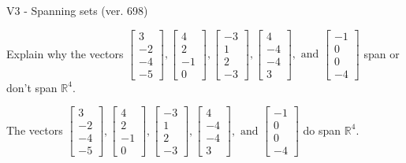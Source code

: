 \begin{exercise}
  \begin{exerciseTitle}V3 - Spanning sets (ver. 698)\end{exerciseTitle}
  \begin{exerciseStatement}
    Explain why the vectors \(\left[\begin{array}{r}
3 \\
-2 \\
-4 \\
-5
\end{array}\right] , \left[\begin{array}{r}
4 \\
2 \\
-1 \\
0
\end{array}\right] , \left[\begin{array}{r}
-3 \\
1 \\
2 \\
-3
\end{array}\right] , \left[\begin{array}{r}
4 \\
-4 \\
-4 \\
3
\end{array}\right] , \text{ and } \left[\begin{array}{r}
-1 \\
0 \\
0 \\
-4
\end{array}\right]\) span or don't span \(\mathbb{R}^4\). 
	


  \end{exerciseStatement}
  \begin{exerciseAnswer}
   The vectors \(\left[\begin{array}{r}
3 \\
-2 \\
-4 \\
-5
\end{array}\right] , \left[\begin{array}{r}
4 \\
2 \\
-1 \\
0
\end{array}\right] , \left[\begin{array}{r}
-3 \\
1 \\
2 \\
-3
\end{array}\right] , \left[\begin{array}{r}
4 \\
-4 \\
-4 \\
3
\end{array}\right] , \text{ and } \left[\begin{array}{r}
-1 \\
0 \\
0 \\
-4
\end{array}\right]\) 
  	 do  
	span \(\mathbb{R}^4\).
  



\end{exerciseAnswer}
\end{exercise}
